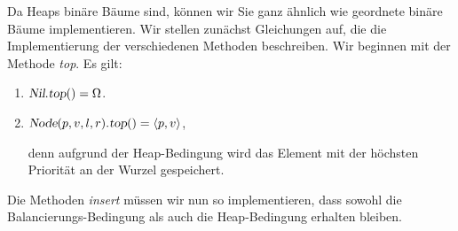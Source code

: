 Da Heaps bin\"are
B\"aume sind, k\"onnen wir Sie ganz \"ahnlich wie geordnete bin\"are B\"aume  implementieren. 
Wir stellen zun\"achst Gleichungen auf, die die Implementierung der verschiedenen Methoden
beschreiben.  Wir beginnen mit der  Methode \textsl{top}.  Es gilt:
\begin{enumerate}
\item $\textsl{Nil}.\textsl{top}() = \Omega$.
\item $\textsl{Node}(p,v,l,r).\textsl{top}() = \pair(p,v)$,

      denn aufgrund der Heap-Bedingung wird das Element mit der h\"ochsten Priorit\"at 
      an der Wurzel gespeichert.
\end{enumerate}
Die Methoden \textsl{insert} m\"ussen wir nun so implementieren, dass
sowohl die Balancierungs-Bedingung als auch die Heap-Bedingung erhalten bleiben.
